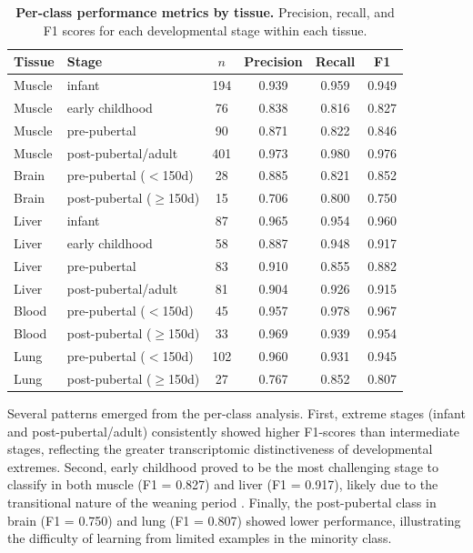 \begin{table}[H]
\centering
\caption{\textbf{Per-class performance metrics by tissue.} Precision, recall, and F1 scores for each developmental stage within each tissue.}
\label{tab:perclass}
\small
\begin{tabular}{llcccc}
\toprule
\textbf{Tissue} & \textbf{Stage} & \textbf{$n$} & \textbf{Precision} & \textbf{Recall} & \textbf{F1} \\
\midrule
Muscle & infant & 194 & 0.939 & 0.959 & 0.949 \\
Muscle & early childhood & 76 & 0.838 & 0.816 & 0.827 \\
Muscle & pre-pubertal & 90 & 0.871 & 0.822 & 0.846 \\
Muscle & post-pubertal/adult & 401 & 0.973 & 0.980 & 0.976 \\
\midrule
Brain & pre-pubertal ($<$150d) & 28 & 0.885 & 0.821 & 0.852 \\
Brain & post-pubertal ($\geq$150d) & 15 & 0.706 & 0.800 & 0.750 \\
\midrule
Liver & infant & 87 & 0.965 & 0.954 & 0.960 \\
Liver & early childhood & 58 & 0.887 & 0.948 & 0.917 \\
Liver & pre-pubertal & 83 & 0.910 & 0.855 & 0.882 \\
Liver & post-pubertal/adult & 81 & 0.904 & 0.926 & 0.915 \\
\midrule
Blood & pre-pubertal ($<$150d) & 45 & 0.957 & 0.978 & 0.967 \\
Blood & post-pubertal ($\geq$150d) & 33 & 0.969 & 0.939 & 0.954 \\
\midrule
Lung & pre-pubertal ($<$150d) & 102 & 0.960 & 0.931 & 0.945 \\
Lung & post-pubertal ($\geq$150d) & 27 & 0.767 & 0.852 & 0.807 \\
\bottomrule
\end{tabular}
\end{table}

Several patterns emerged from the per-class analysis. First, extreme stages (infant and post-pubertal/adult) consistently showed higher F1-scores than intermediate stages, reflecting the greater transcriptomic distinctiveness of developmental extremes. Second, early childhood proved to be the most challenging stage to classify in both muscle (F1 = 0.827) and liver (F1 = 0.917), likely due to the transitional nature of the weaning period \parencite{pluske_gastrointestinal_2018}. Finally, the post-pubertal class in brain (F1 = 0.750) and lung (F1 = 0.807) showed lower performance, illustrating the difficulty of learning from limited examples in the minority class.

